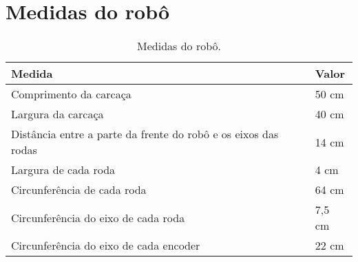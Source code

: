 \documentclass[oneside,a4paper,12pt]{normas-utf-tex}
\renewcommand{\toprule}{\midrule[\heavyrulewidth]}
\begin{document}
\apendice



\chapter{Medidas do robô}
\label{cap:medidas_robo}


\begin{table}[H]
  \caption{Medidas do robô.}
  \centering
  \begin{tabular}{l|l}
    \toprule
    \textbf{Medida} & \textbf{Valor} \\
    \midrule
    Comprimento da carcaça & 50 cm \\ \hline
    Largura da carcaça & 40 cm \\ \hline
    Distância entre a parte da frente do robô e os eixos das rodas & 14 cm \\ \hline
    Largura de cada roda & 4 cm \\ \hline
    Circunferência de cada roda & 64 cm \\ \hline
    Circunferência do eixo de cada roda & 7,5 cm \\ \hline
    Circunferência do eixo de cada encoder & 22 cm \\ 
    \bottomrule
  \end{tabular}
  \label{tab:medidas_robo}
\end{table}


\raggedright

\end{document}
